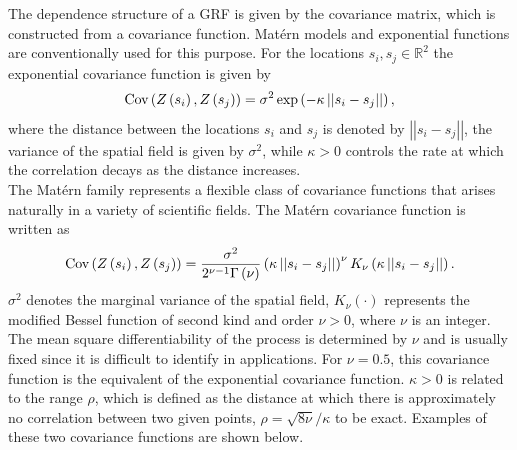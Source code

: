 The dependence structure of a GRF is given by the covariance matrix, which is constructed from a covariance function. Matérn models and exponential functions are conventionally used for this purpose. For the locations $s_i, s_j\in\mathbb{R}^2$ the exponential covariance function is given by
\begin{equation}
\hbox{Cov}\left(Z\left(s_i\right), Z\left(s_j\right)\right)=\sigma^2\exp\left(-\kappa\left|\left|s_i-s_j\right|\right|\right),
\end{equation}
where the distance between the locations $s_i$ and $s_j$ is denoted by $\left|\left|s_i-s_j\right|\right|$, the variance of the spatial field is given by $\sigma^2$, while $\kappa>0$ controls the rate at which the correlation decays as the distance increases. \\
The Matérn family represents a flexible class of covariance functions that arises naturally in a variety of scientific fields. The Matérn covariance function is written as
\begin{equation}
    \hbox{Cov}\left(Z\left(s_i\right),Z\left(s_j\right)\right)=\frac{\sigma^2}{2^{\nu-1}\Gamma\left(\nu\right)}\left(\kappa\left|\left|s_i-s_j\right|\right|\right)^{\nu}K_\nu\left(\kappa\left|\left|s_i-s_j\right|\right|\right).
\end{equation}
$\sigma^2$ denotes the marginal variance of the spatial field, $K_\nu\left(\cdot\right)$ represents the modified Bessel function of second kind and order $\nu>0$, where $\nu$ is an integer. The mean square differentiability of the process is determined by $\nu$ and is usually fixed since it is difficult to identify in applications. For $\nu=0.5$, this covariance function is the equivalent of the exponential covariance function. $\kappa > 0$ is related to the range $\rho$, which is defined as the distance at which there is approximately no correlation between two given points, $\rho=\sqrt{8\nu}/\kappa$ to be exact. Examples of these two covariance functions are shown below\autocite[Cf.][]{moraga2019geospatial}. 
